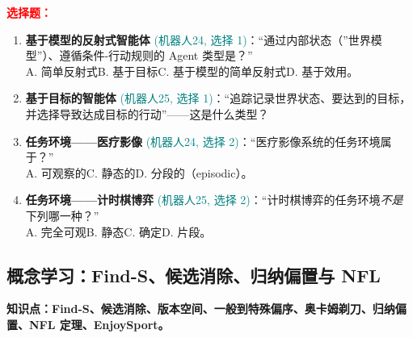 ﻿\documentclass[../main.tex]{subfiles}
\begin{document}
\noindent\textbf{\textcolor{red}{选择题：}}
\begin{enumerate}[itemsep=0.45em, topsep=0.2em, leftmargin=1.5em]
    \item \textbf{基于模型的反射式智能体} \textcolor{teal}{(机器人24, 选择 1)}：``通过内部状态（''世界模型''）、遵循条件-行动规则的 Agent 类型是？''\\
    A. 简单反射式\quad B. 基于目标\quad C. 基于模型的简单反射式\quad D. 基于效用。 

    \item \textbf{基于目标的智能体} \textcolor{teal}{(机器人25, 选择 1)}：``追踪记录世界状态、要达到的目标，并选择导致达成目标的行动''——这是什么类型？\\
     

    \item \textbf{任务环境——医疗影像} \textcolor{teal}{(机器人24, 选择 2)}：``医疗影像系统的任务环境属于？''\\
    A. 可观察的\quad {}\quad C. 静态的\quad D. 分段的（episodic）。 

    \item \textbf{任务环境——计时棋博弈} \textcolor{teal}{(机器人25, 选择 2)}：``计时棋博弈的任务环境\emph{不是}下列哪一种？''\\
    A. 完全可观\quad B. 静态\quad C. 确定\quad D. 片段。 
\end{enumerate}

\subsection{概念学习：Find-S、候选消除、归纳偏置与 NFL}

\noindent\textbf{知识点：Find-S、候选消除、版本空间、一般到特殊偏序、奥卡姆剃刀、归纳偏置、NFL 定理、EnjoySport。}
\end{document}
